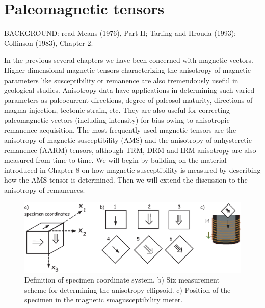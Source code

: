 \chapter{Paleomagnetic tensors}

\noindent
BACKGROUND: 
read  Means (1976), Part II;   \nocite{means76}
Tarling and Hrouda (1993); \nocite{tarling93}
Collinson (1983), Chapter 2. \nocite{collinson83}

\vskip 24pt

In the previous several chapters we have been concerned with magnetic vectors.  Higher dimensional magnetic tensors characterizing the anisotropy of magnetic parameters like susceptibility or remanence are
also tremendously useful in geological studies.   Anisotropy data have applications   
in determining such varied parameters as paleocurrent
directions, degree of paleosol maturity, directions of magma injection, 
 tectonic strain, etc.  They are also useful for correcting paleomagnetic vectors (including intensity) for bias owing to anisotropic remanence acquisition.   
  The most frequently used magnetic tensors are the 
  anisotropy of magnetic susceptibility (AMS) and the anisotropy of 
  anhysteretic remanence (AARM) tensors, although TRM, DRM and IRM anisotropy are also measured from time to time.  We will begin by building on the material introduced in Chapter 8 on how magnetic susceptibility is measured by describing  how the AMS tensor is determined.  Then we will extend the discussion to the anisotropy of remanences.  

\begin{figure}[htb]
\centering  \includegraphics[width=14 cm]{EPSfiles/measAMS.eps}
\caption{Definition of specimen coordinate system.  b) Six measurement scheme for determining the anisotropy ellipsoid.  c) Position of the specimen in the magnetic smagusceptibility meter. }
\label{fig:measAMS}
\end{figure}


